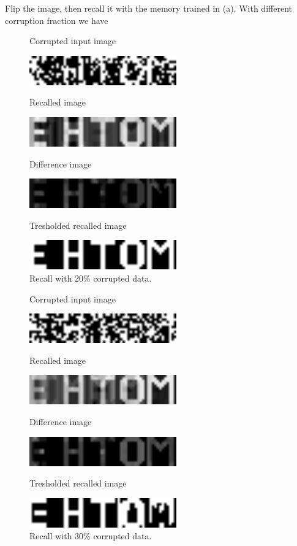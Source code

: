 \documentclass[epsfig]{article}
\begin{document}
Flip the image, then recall it with the memory trained in (a). With different corruption fraction we have\\ 
\begin{figure}[H] 
	\centerline{Corrupted input image}
	\centering\includegraphics[width=2.5in]{p20.png} 
		\centerline{Recalled image}
		\centering\includegraphics[width=2.5in]{p22.png} 
			\centerline{Difference image}
			\centering\includegraphics[width=2.5in]{p2d.png}
			 	\centerline{Tresholded recalled image}
						\centering\includegraphics[width=2.5in]{oricha.png} 
	\caption{Recall with 20\% corrupted data.   }\label{fig:1} 
\end{figure} 
\begin{figure}[H] 
	\centerline{Corrupted input image}
	\centering\includegraphics[width=2.5in]{p33i.png} 
	\centerline{Recalled image}
	\centering\includegraphics[width=2.5in]{p33.png} 
	\centerline{Difference image}
	\centering\includegraphics[width=2.5in]{p33d.png}
	\centerline{Tresholded recalled image}
	\centering\includegraphics[width=2.5in]{p33o.png} 
	\caption{Recall with 30\% corrupted data.   }\label{fig:2} 
\end{figure} 
\end{document}
